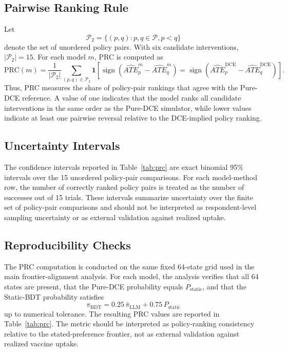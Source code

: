 \documentclass[11pt]{article}
\begin{document}
\subsection{Pairwise Ranking Rule}

Let
\[
\mathcal{P}_2
=
\{(p,q): p,q\in\mathcal{P}, p<q\}
\]
denote the set of unordered policy pairs. With six candidate interventions, \(|\mathcal{P}_2|=15\). For each model \(m\), PRC is computed as
\[
\mathrm{PRC}(m)
=
\frac{1}{|\mathcal{P}_2|}
\sum_{(p,q)\in\mathcal{P}_2}
\mathbf{1}
\left[
\operatorname{sign}\!\left(
\widehat{ATE}^{m}_{p}
-
\widehat{ATE}^{m}_{q}
\right)
=
\operatorname{sign}\!\left(
\widehat{ATE}^{\mathrm{DCE}}_{p}
-
\widehat{ATE}^{\mathrm{DCE}}_{q}
\right)
\right].
\]
Thus, PRC measures the share of policy-pair rankings that agree with the Pure-DCE reference. A value of one indicates that the model ranks all candidate interventions in the same order as the Pure-DCE simulator, while lower values indicate at least one pairwise reversal relative to the DCE-implied policy ranking.

\subsection{Uncertainty Intervals}

The confidence intervals reported in Table~\ref{tab:prc} are exact binomial 95\% intervals over the 15 unordered policy-pair comparisons. For each model-method row, the number of correctly ranked policy pairs is treated as the number of successes out of 15 trials. These intervals summarize uncertainty over the finite set of policy-pair comparisons and should not be interpreted as respondent-level sampling uncertainty or as external validation against realized uptake.

\subsection{Reproducibility Checks}

The PRC computation is conducted on the same fixed 64-state grid used in the main frontier-alignment analysis. For each model, the analysis verifies that all 64 states are present, that the Pure-DCE probability equals \(P_{\mathrm{static}}\), and that the Static-BDT probability satisfies
\[
\pi_{\mathrm{BDT}}
=
0.25\,\bar{\pi}_{\mathrm{LLM}}
+
0.75\,P_{\mathrm{static}}
\]
up to numerical tolerance. The resulting PRC values are reported in Table~\ref{tab:prc}. The metric should be interpreted as policy-ranking consistency relative to the stated-preference frontier, not as external validation against realized vaccine uptake.
\end{document}
